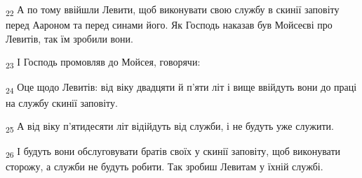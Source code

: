 \begin{tcolorbox}
\textsubscript{22} А по тому ввійшли Левити, щоб виконувати свою службу в скинії заповіту перед Аароном та перед синами його. Як Господь наказав був Мойсеєві про Левитів, так їм зробили вони.
\end{tcolorbox}
\begin{tcolorbox}
\textsubscript{23} І Господь промовляв до Мойсея, говорячи:
\end{tcolorbox}
\begin{tcolorbox}
\textsubscript{24} Оце щодо Левитів: від віку двадцяти й п'яти літ і вище ввійдуть вони до праці на службу скинії заповіту.
\end{tcolorbox}
\begin{tcolorbox}
\textsubscript{25} А від віку п'ятидесяти літ відійдуть від служби, і не будуть уже служити.
\end{tcolorbox}
\begin{tcolorbox}
\textsubscript{26} І будуть вони обслуговувати братів своїх у скинії заповіту, щоб виконувати сторожу, а служби не будуть робити. Так зробиш Левитам у їхній службі.
\end{tcolorbox}
